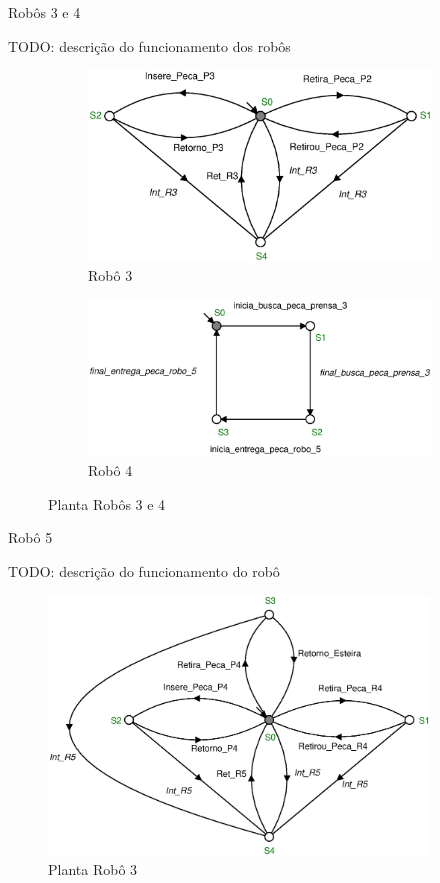 Robôs 3 e 4

TODO: descrição do funcionamento dos robôs

\begin{figure}[H]%
  \centering
  \begin{subfigure}[b]{0.45\textwidth}
      \centering
      \includegraphics[width=\textwidth]{imagens/Robo_3.eps}
      \caption{Robô 3}
      \label{fig:r3}
  \end{subfigure}
  \hfill
  \begin{subfigure}[b]{0.45\textwidth}
      \centering
      \includegraphics[width=\textwidth]{imagens/Robo_4.eps}
      \caption{Robô 4}
      \label{fig:r4}
  \end{subfigure}
  \caption{Planta Robôs 3 e 4}
  \label{fig:robo34}
\end{figure}

Robô 5

TODO: descrição do funcionamento do robô

\begin{figure}[H]%
    \centering
    \includegraphics[width=0.9\textwidth]{imagens/robo_5.eps}
    \caption{Planta Robô 3}\label{fig:robo5}
\end{figure}


